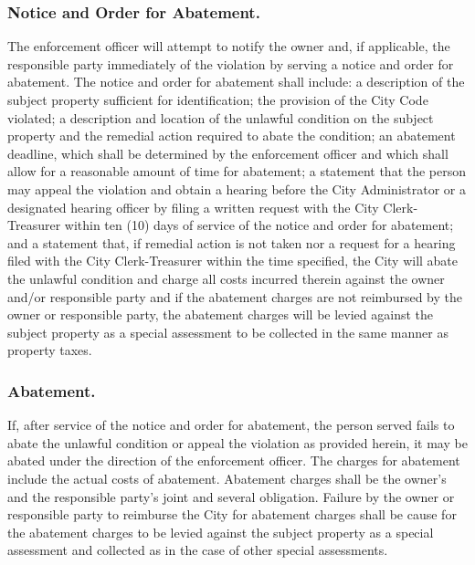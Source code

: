 \subsubsection{Notice and Order for Abatement.}
The enforcement officer will attempt to notify the owner and, if applicable, the responsible party immediately of the violation by serving a notice and order for abatement. The notice and order for abatement shall include: a description of the subject property sufficient for identification; the provision of the City Code violated; a description and location of the unlawful condition on the subject property and the remedial action required to abate the condition; an abatement deadline, which shall be determined by the enforcement officer and which shall allow for a reasonable amount of time for abatement; a statement that the person may appeal the violation and obtain a hearing before the City Administrator or a designated hearing officer by filing a written request with the City Clerk-Treasurer within ten (10) days of service of the notice and order for abatement; and a statement that, if remedial action is not taken nor a request for a hearing filed with the City Clerk-Treasurer within the time specified, the City will abate the unlawful condition and charge all costs incurred therein against the owner and/or responsible party and if the abatement charges are not reimbursed by the owner or responsible party, the abatement charges will be levied against the subject property as a special assessment to be collected in the same manner as property taxes.
\subsubsection{Abatement.}
If, after service of the notice and order for abatement, the person served fails to abate the unlawful condition or appeal the violation as provided herein, it may be abated under the direction of the enforcement officer. The charges for abatement include the actual costs of abatement. Abatement charges shall be the owner's and the responsible party's joint and several obligation. Failure by the owner or responsible party to reimburse the City for abatement charges shall be cause for the abatement charges to be levied against the subject property as a special assessment and collected as in the case of other special assessments.
